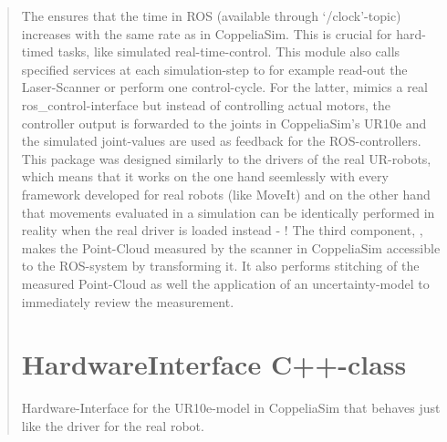 \documentclass[letterpaper,10pt,english]{sphinxmanual}
\begin{document}
\begin{quote}
 The {\hyperref[\detokenize{SimulationSynchronizer:simulation-synchronizer}]{}} ensures that the time in ROS (available through ‘/clock’-topic) increases with the same rate as in CoppeliaSim.
This is crucial for hard-timed tasks, like simulated real-time-control. This module also calls specified services at each simulation-step to for example read-out the Laser-Scanner or perform one control-cycle.
For the latter, {\hyperref[\detokenize{HardwareInterface:hardware-interface}]{}} mimics a real ros\_control-interface but instead of controlling actual motors, the controller output is forwarded to the joints in CoppeliaSim’s UR10e and
the simulated joint-values are used as feedback for the ROS-controllers. This package was designed similarly to the drivers of the real UR-robots, which means that it works
on the one hand seemlessly with every framework developed for real robots (like MoveIt) and on the other hand that movements evaluated in a simulation
can be identically performed in reality when the real driver is loaded instead - !
The third component, {\hyperref[\detokenize{point_cloud_manager:point-cloud-manager}]{}} , makes the Point-Cloud measured by the scanner in CoppeliaSim accessible to the ROS-system by transforming it. It also performs
stitching of the measured Point-Cloud as well the application of an uncertainty-model to immediately review the measurement.


\chapter{HardwareInterface C++-class}
\label{\detokenize{HardwareInterface:hardware-interface}}\label{\detokenize{HardwareInterface::doc}}\label{\detokenize{HardwareInterface:hardwareinterface-c-class}}

\begin{fulllineitems}
\label{\detokenize{HardwareInterface:_CPPv2N21coppeliasim_interface17HardwareInterfaceE}}%
\pysigstartmultiline
{}\label{\detokenize{HardwareInterface:project0classcoppeliasim__interface_1_1HardwareInterface}}%
\pysigstopmultiline
Hardware-Interface for the UR10e-model in CoppeliaSim that behaves just like the driver for the real robot. 

\end{fulllineitems}
\end{quote}
\end{document}
